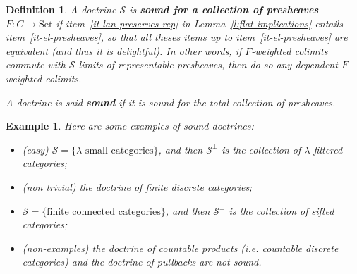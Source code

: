 \documentclass{article}
\newcommand{\Set}{\text{Set}}
\newtheorem{definition}[theorem]{Definition}
\newtheorem{example}[theorem]{Example}
\begin{document}
\begin{definition}
  A doctrine $\mathcal{S}$ is \textbf{sound for a collection of presheaves $F :
    C \rightarrow \Set$}
  if
  item~\ref{it-lan-preserves-rep} in Lemma~\ref{l:flat-implications} entails
  item~\ref{it-el-presheaves}, so that
  all theses items up to item~\ref{it-el-presheaves} are
  equivalent %
  (and thus it is delightful).
  In other words, if $F$-weighted colimits commute with $\mathcal{S}$-limits of
  representable presheaves, then do so any dependent $F$-weighted colimits.

  A doctrine is said \textbf{sound} if it is sound for the total collection of presheaves.
\end{definition}
\begin{example}
  Here are some examples \cite[Example 2.3]{lack_accessible} of sound doctrines:
  \begin{itemize}
  \item (easy)
    $\mathcal{S} = \{ \lambda\text{-small categories} \}$, and then
    $\mathcal{S}^\bot$ is the collection of $\lambda$-filtered categories;
  \item (non trivial) the doctrine of finite discrete categories;
  \item 
    $\mathcal{S} = \{ \text{finite connected categories} \}$, and then
    $\mathcal{S}^\bot$ is the collection of sifted categories;
  \item (non-examples) the doctrine of countable products (i.e. countable
    discrete categories) and the doctrine of pullbacks are not sound.
  \end{itemize}
\end{example}
\end{document}
